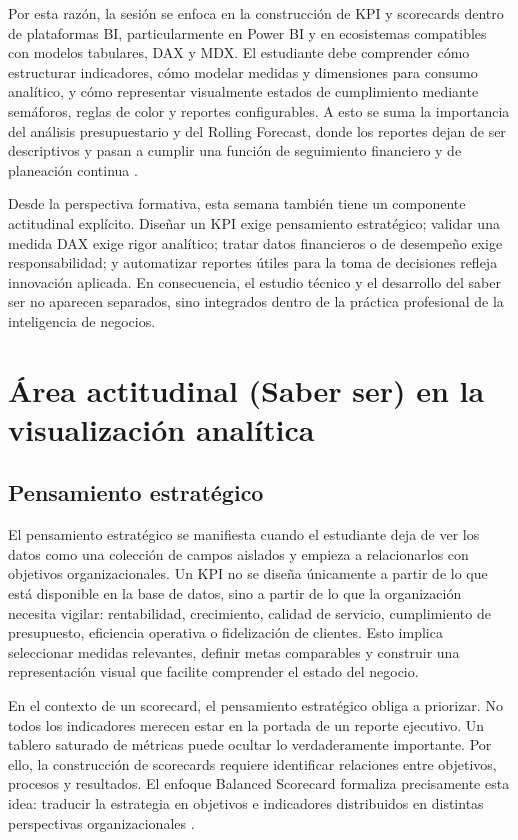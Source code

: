 \documentclass[12pt]{article}
\begin{document}
Por esta razón, la sesión se enfoca en la construcción de KPI y scorecards dentro de plataformas BI, particularmente en Power BI y en ecosistemas compatibles con modelos tabulares, DAX y MDX. El estudiante debe comprender cómo estructurar indicadores, cómo modelar medidas y dimensiones para consumo analítico, y cómo representar visualmente estados de cumplimiento mediante semáforos, reglas de color y reportes configurables. A esto se suma la importancia del análisis presupuestario y del Rolling Forecast, donde los reportes dejan de ser descriptivos y pasan a cumplir una función de seguimiento financiero y de planeación continua \cite{ms_budget_comparison,oracle_rolling_forecast}.

Desde la perspectiva formativa, esta semana también tiene un componente actitudinal explícito. Diseñar un KPI exige pensamiento estratégico; validar una medida DAX exige rigor analítico; tratar datos financieros o de desempeño exige responsabilidad; y automatizar reportes útiles para la toma de decisiones refleja innovación aplicada. En consecuencia, el estudio técnico y el desarrollo del saber ser no aparecen separados, sino integrados dentro de la práctica profesional de la inteligencia de negocios.

\section{Área actitudinal (Saber ser) en la visualización analítica}
\subsection{Pensamiento estratégico}
El pensamiento estratégico se manifiesta cuando el estudiante deja de ver los datos como una colección de campos aislados y empieza a relacionarlos con objetivos organizacionales. Un KPI no se diseña únicamente a partir de lo que está disponible en la base de datos, sino a partir de lo que la organización necesita vigilar: rentabilidad, crecimiento, calidad de servicio, cumplimiento de presupuesto, eficiencia operativa o fidelización de clientes. Esto implica seleccionar medidas relevantes, definir metas comparables y construir una representación visual que facilite comprender el estado del negocio.

En el contexto de un scorecard, el pensamiento estratégico obliga a priorizar. No todos los indicadores merecen estar en la portada de un reporte ejecutivo. Un tablero saturado de métricas puede ocultar lo verdaderamente importante. Por ello, la construcción de scorecards requiere identificar relaciones entre objetivos, procesos y resultados. El enfoque Balanced Scorecard formaliza precisamente esta idea: traducir la estrategia en objetivos e indicadores distribuidos en distintas perspectivas organizacionales \cite{kaplan1992measures,kaplan1996bsc}.
\end{document}
